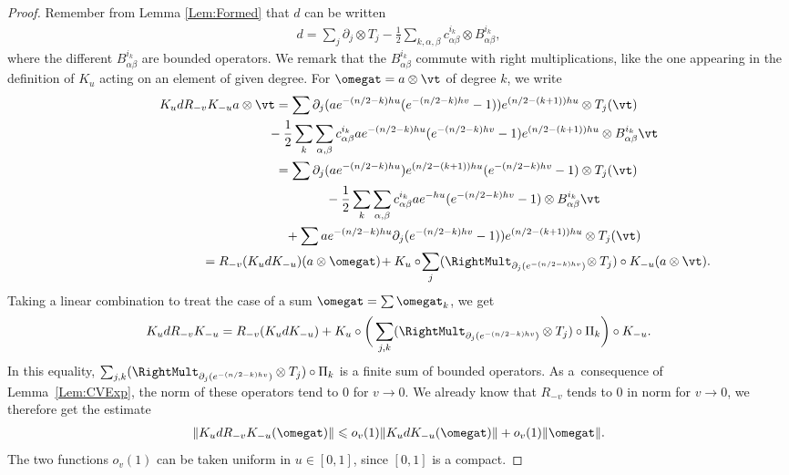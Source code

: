 \begin{proof}
Remember from Lemma \ref{Lem:Formed} that $d$ can be written
\begin{gather*}
d = \sum_j \partial_j \otimes T_j - \frac{1}{2} \sum_{k,\alpha,\beta} c^{i_k}_{\alpha \beta} \otimes B^{i_k}_{\alpha \beta},
\end{gather*}
where the dif\/ferent $B^{i_k}_{\alpha \beta}$ are bounded operators. We remark that the $B^{i_k}_{\alpha \beta}$ commute with right multiplications, like the one appearing in the def\/inition of $K_u$ acting on an element of given degree. For $\omegat = a \otimes \vt$ of degree $k$, we write
\begin{gather*}
K_u d R_{-v} K_{-u} a \otimes \vt = \sum \partial _j(a e^{-(n/2-k)h u}(e^{-(n/2-k) hv} -1) )e^{(n/2-(k+1)) h u} \otimes T_j( \vt ) \\
\hphantom{K_u d R_{-v} K_{-u} a \otimes \vt =}{}
- \frac{1}{2} \sum_{k} \sum_{\alpha, \beta} c^{i_k}_{\alpha \beta} a e^{-(n/2-k)h u}(e^{-(n/2-k) hv} -1) e^{(n/2-(k+1)) h u} \otimes B^{i_k}_{\alpha \beta} \vt \\
\hphantom{K_u d R_{-v} K_{-u} a \otimes \vt }{}
= \sum \partial _j(a e^{-(n/2-k)h u})e^{(n/2-(k+1)) h u} (e^{-(n/2-k) hv} -1) \otimes T_j( \vt ) \\
\hphantom{K_u d R_{-v} K_{-u} a \otimes \vt =}{}
- \frac{1}{2} \sum_{k} \sum_{\alpha, \beta} c^{i_k}_{\alpha \beta} a e^{-h u} (e^{-(n/2-k) hv} -1) \otimes B^{i_k}_{\alpha \beta} \vt \\
\hphantom{K_u d R_{-v} K_{-u} a \otimes \vt =}{}
+ \sum a e^{-(n/2-k)h u}\partial _j(e^{-(n/2-k) hv} -1) )e^{(n/2-(k+1)) h u} \otimes T_j( \vt ) \\
\hphantom{K_u d R_{-v} K_{-u} a \otimes \vt }{}
= R_{-v}(K_u d K_{-u})(a \otimes \omegat) \! + K_{u} \circ\! \sum_{j} (\RightMult_{\partial _j(e^{-(n/2-k) h v})}\! \otimes T_j) \circ K_{-u}(a \otimes \vt).
\end{gather*}
Taking a linear combination to treat the case of a sum $\omegat = \sum \omegat_k$, we get
\begin{gather*}
K_u d R_{-v} K_{-u} = R_{-v}(K_u d K_{-u}) + K_{u} \circ \bigg( \sum_{j,k} (\RightMult_{\partial _j(e^{-(n/2-k) h v})} \otimes T_j) \circ \Pi_k \bigg) \circ K_{-u}.
\end{gather*}
In this equality, $\sum_{j,k} (\RightMult_{\partial _j(e^{-(n/2-k) h v})} \otimes T_j) \circ \Pi_k$ is a f\/inite sum of bounded operators. As a~consequence of Lemma~\ref{Lem:CVExp}, the norm of these operators tend to $0$ for $ v \to 0$. We already know that $R_{-v}$ tends to $0$ in norm for $v \to 0$, we therefore get the estimate
\begin{gather}
\label{Eqn:EstimateKdRK}
\| K_u d R_{-v} K_{-u}( \omegat) \| \leqslant o_v(1) \| K_u d K_{-u}( \omegat) \| + o_v(1) \| \omegat \|.
\end{gather}
The two functions $o_v(1)$ can be taken uniform in $u \in [0,1]$, since $[0,1]$ is a compact.


\end{proof}

